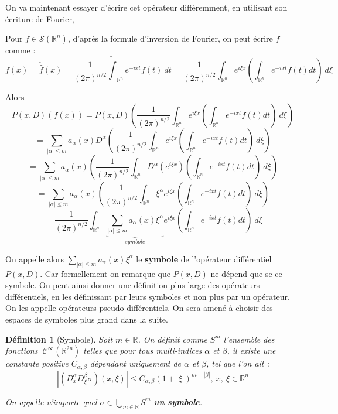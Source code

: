 \documentclass[a4paper, 12pt]{report}
\newcommand{\R}{\mathbb{R}} %
\renewcommand{\.}{\cdot} %
\theoremstyle{break}
\newtheorem{definition}{Définition}
\theoremstyle{remark}
\theoremstyle{proofstyle}
\begin{document}
On va maintenant essayer d'écrire cet opérateur différemment, en utilisant son écriture de Fourier,

Pour $f \in \mathcal{S}(\R^n)$, d'après la formule d'inversion de Fourier, on peut écrire $f$ comme : $$f(x) = \check{\hat{f}}(x) =\frac{1}{(2 \pi)^{n/2}} \check{\int}_{\mathbb{R}^n} e^{-i x t} f(t) ~ dt =\frac{1}{(2 \pi)^{n/2}} \int_{\mathbb{R}^n} e^{i \xi x} \left(\int_{\mathbb{R}^n} e^{-ixt} f(t) dt\right) ~ d \xi$$

Alors $$P(x,D)(f(x)) = P(x,D)\left(\frac{1}{(2 \pi)^{n/2}}\int_{\mathbb{R}^n} e^{i \xi x} \left(\int_{\mathbb{R}^n} e^{-ixt} f(t) dt\right) ~ d \xi\right)$$
$$= \underset{|\alpha| \leq m}{\sum} a_\alpha (x) D^\alpha \left(\frac{1}{(2 \pi)^{n/2}}\int_{\mathbb{R}^n} e^{i \xi x} \left(\int_{\mathbb{R}^n} e^{-ixt} f(t) dt\right) ~ d \xi\right)$$
$$= \underset{|\alpha| \leq m}{\sum} a_\alpha (x) \left(\frac{1}{(2 \pi)^{n/2}}\int_{\mathbb{R}^n} D^\alpha (e^{i \xi x}) \left(\int_{\mathbb{R}^n} e^{-ixt} f(t) dt\right) ~ d \xi\right)$$
$$= \underset{|\alpha| \leq m}{\sum} a_\alpha (x) \left(\frac{1}{(2 \pi)^{n/2}}\int_{\mathbb{R}^n} \xi^\alpha e^{i \xi x} \left(\int_{\mathbb{R}^n} e^{-ixt} f(t) dt\right) ~ d \xi\right)$$
$$=\frac{1}{(2 \pi)^{n/2}} \int_{\mathbb{R}^n} \underset{symbole}{\underbrace{\underset{|\alpha| \leq m}{\sum} a_\alpha (x) \xi^\alpha}} e^{i \xi x} \left(\int_{\mathbb{R}^n} e^{-ixt} f(t) dt\right) ~ d\xi$$

On appelle alors $\underset{|\alpha| \leq m}{\sum} a_\alpha (x) \xi^\alpha$ le \textbf{symbole} de l'opérateur différentiel $P(x,D)$. Car formellement on remarque que $P(x,D)$ ne dépend que se ce symbole. On peut ainsi donner une définition plus large des opérateurs différentiels, en les définissant par leurs symboles et non plus par un opérateur. On les appelle opérateurs pseudo-différentiels. On sera amené à choisir des espaces de symboles plus grand dans la suite.

\begin{definition}[Symbole]
    Soit $m \in \mathbb{R}$. On définit comme $S^m$ l'ensemble des fonctions $~\mathcal{C}^\infty(\mathbb{R}^{2n})$ telles que pour tous multi-indices $\alpha$ et $\beta$, il existe une constante positive $C_{\alpha, \beta}$ dépendant uniquement de $\alpha$ et $\beta$, tel que l'on ait :
    $$|(D_x^\alpha D_\xi^\beta \sigma)(x, \xi)| \leq C_{\alpha, \beta}(1+|\xi|)^{m-|\beta|},~ x,~ \xi \in \mathbb{R}^n$$

    On appelle n'importe quel $\sigma \in \underset{m \in \mathbb{R}}{\bigcup} S^m$ \textbf{un symbole}.
\end{definition}
\end{document}
